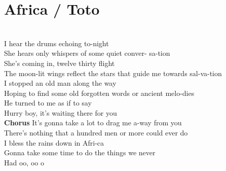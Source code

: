 \section{Africa / Toto}\label{sec:africa}
\Aminor
\BflatMajor
\Bminor
\BminorSeven
\Cmajor
\Dminor
\Eminor
\EminorSeven
\Fmajor
\Gmajor

       \\
 I hear the drums  echoing to-night\\
She hears only  whispers of some  quiet conver- sa-tion \\
 She's coming  in, twelve thirty  flight\\
The moon-lit wings  reflect the stars that  guide me towards  sal-va-tion\\
 I stopped an  old man along the  way\\
Hoping to find some  old forgotten  words or ancient  melo-dies \\
 He turned to  me as if to  say\\
 Hurry boy, it's  waiting there for you \\
\textbf{Chorus}
 It's gonna take a  lot to drag me a-way from  you\\
 There's nothing that a  hundred men or  more could ever  do\\
 I bless the  rains down in  Afri-ca\\
 Gonna take some  time to do the  things we never\\
 Had                  oo, oo o\\

